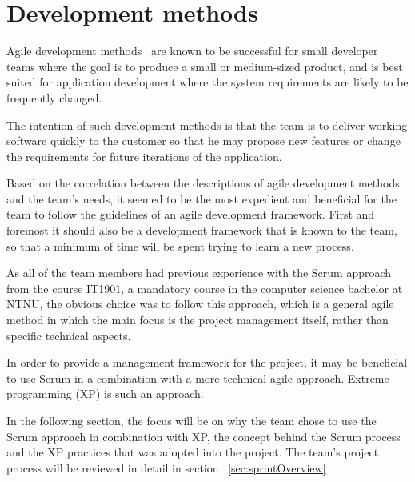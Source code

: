 \section{Development methods}

Agile development methods~\cite{scrum} are known to be successful for small developer teams where the goal is to produce a small or medium-sized product, and is best suited for application development where the system requirements are likely to be frequently changed.

The intention of such development methods is that the team is to deliver working software quickly to the customer so that he may propose new features or change the requirements for future iterations of the application.

Based on the correlation between the descriptions of agile development methods and the team's needs, it seemed to be the most expedient and beneficial for the team to follow the guidelines of an agile development framework. First and foremost it should also be a development framework that is known to the team, so that a minimum of time will be spent trying to learn a new process.

As all of the team members had previous experience with the Scrum approach from the course IT1901, a mandatory course in the computer science bachelor at NTNU, the obvious choice was to follow this approach, which is a general agile method in which the main focus is the project management itself, rather than specific technical aspects.

In order to provide a management framework for the project, it may be beneficial to use Scrum in a combination with a more technical agile approach. Extreme programming (XP) is such an approach.

In the following section, the focus will be on why the team chose to use the Scrum approach in combination with XP, the concept behind the Scrum process and the XP practices that was adopted into the project. The team's project process will be reviewed in detail in section ~\ref{sec:sprintOverview}
